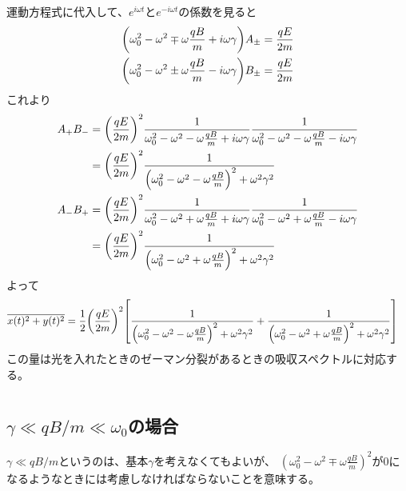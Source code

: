 \documentclass[../ap_2011.tex]{subfiles}
\begin{document}
運動方程式に代入して、\(e^{i\omega t}\)と\(e^{-i\omega t}\)の係数を見ると
\begin{equation}\begin{aligned}[b]
    \qty(\omega_0^2-\omega^2\mp\omega\frac{qB}{m}+i\omega \gamma)A_\pm &= \frac{qE}{2m}\\
    \qty(\omega_0^2-\omega^2\pm\omega\frac{qB}{m}-i\omega \gamma)B_\pm &= \frac{qE}{2m}
\end{aligned}\end{equation}
これより
\begin{equation}\begin{aligned}[b]
    A_+B_-
    &= \qty(\frac{qE}{2m})^2\frac{1}{\omega_0^2-\omega^2-\omega\frac{qB}{m}+i\omega\gamma}\frac{1}{\omega_0^2-\omega^2-\omega\frac{qB}{m}-i\omega\gamma}\\
    &= \qty(\frac{qE}{2m})^2\frac{1}{\qty(\omega_0^2-\omega^2-\omega\frac{qB}{m})^2+\omega^2\gamma^2}\\
    A_-B_+
    &= \qty(\frac{qE}{2m})^2\frac{1}{\omega_0^2-\omega^2+\omega\frac{qB}{m}+i\omega\gamma}\frac{1}{\omega_0^2-\omega^2+\omega\frac{qB}{m}-i\omega\gamma}\\
    &= \qty(\frac{qE}{2m})^2\frac{1}{\qty(\omega_0^2-\omega^2+\omega\frac{qB}{m})^2+\omega^2\gamma^2}
\end{aligned}\end{equation}
よって
\begin{equation}\begin{aligned}[b]
    \overline{x(t)^2+y(t)^2}
    &=\frac{1}{2}\qty(\frac{qE}{2m})^2\qty[\frac{1}{\qty(\omega_0^2-\omega^2-\omega\frac{qB}{m})^2+\omega^2\gamma^2}
    +\frac{1}{\qty(\omega_0^2-\omega^2+\omega\frac{qB}{m})^2+\omega^2\gamma^2}]
\end{aligned}\end{equation}
この量は光を入れたときのゼーマン分裂があるときの吸収スペクトルに対応する。

\section{}
\subsection*{\(\gamma\ll qB/m \ll \omega_0\)の場合}
\(\gamma\ll qB/m\)というのは、基本\(\gamma\)を考えなくてもよいが、
\((\omega_0^2-\omega^2\mp\omega\frac{qB}{m})^2\)が\(0\)になるようなときには考慮しなければならないことを意味する。
\end{document}

